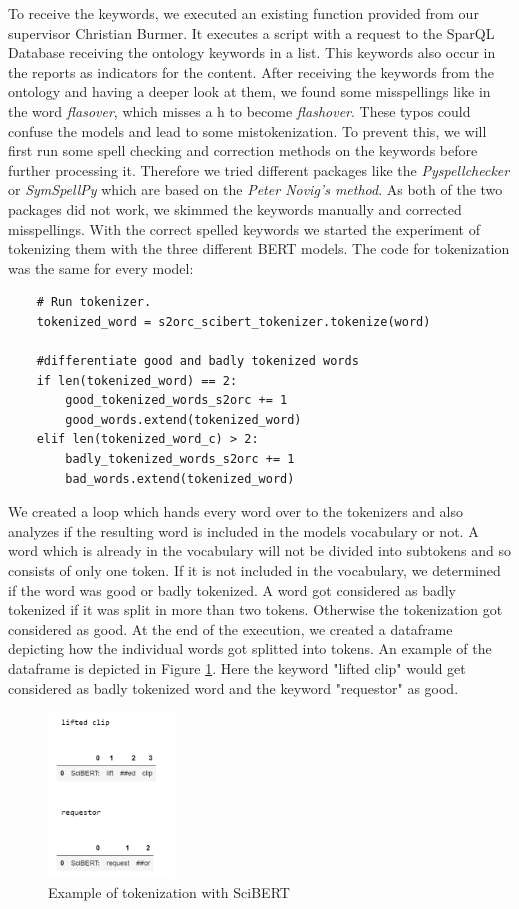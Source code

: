 To receive the keywords, we executed an existing function provided from our supervisor Christian Burmer. It executes a script with a request to the SparQL Database receiving the ontology keywords in a list. This keywords also occur in the reports as indicators for the content. \newline
After receiving the keywords from the ontology and having a deeper look at them, we found some misspellings like in the word \textit{flasover}, which misses a h to become \textit{flashover}. These typos could confuse the models and lead to some mistokenization. To prevent this, we will first run some spell checking and correction methods on the keywords before further processing it. Therefore we tried different packages like the \textit{Pyspellchecker} or \textit{SymSpellPy} which are based on the \textit\alert{{Peter Novig's method}}. As both of the two packages did not work, we skimmed the keywords manually and corrected misspellings. \newline
With the correct spelled keywords we started the experiment of tokenizing them with the three different BERT models. The code for tokenization was the same for every model:
\begin{verbatim}
	# Run tokenizer.
	tokenized_word = s2orc_scibert_tokenizer.tokenize(word)
	
	#differentiate good and badly tokenized words
	if len(tokenized_word) == 2:
		good_tokenized_words_s2orc += 1
		good_words.extend(tokenized_word) 
	elif len(tokenized_word_c) > 2:
		badly_tokenized_words_s2orc += 1
		bad_words.extend(tokenized_word)
\end{verbatim}

We created a loop which hands every word over to the tokenizers and also analyzes if the resulting word is included in the models vocabulary or not. A word which is already in the vocabulary will not be divided into subtokens and so consists of only one token. If it is not included in the vocabulary, we determined if the word was good or badly tokenized. A word got considered as badly tokenized if it was split in more than two tokens. Otherwise the tokenization got considered as good. At the end of the execution, we created a dataframe depicting how the individual words got splitted into tokens. An example of the dataframe is depicted in Figure \ref{fig:goodAndBad}. Here the keyword "lifted clip" would get considered as badly tokenized word and the keyword "requestor" as good.

\begin{figure}[H]
	\centering
	\includegraphics[width=0.3\textwidth]{figures/example_good_bad.PNG}
	\caption{Example of tokenization with SciBERT}
	\label{fig:goodAndBad}
\end{figure}


